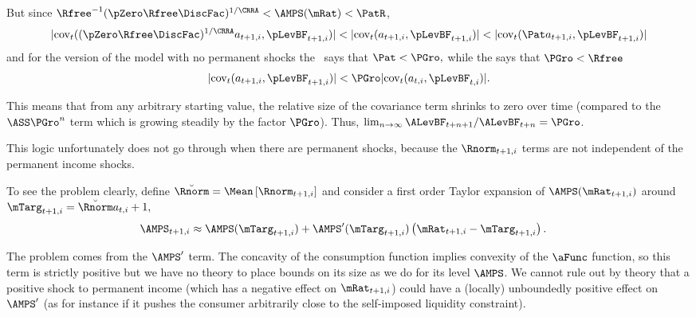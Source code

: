 \documentclass[../BufferStockTheory.tex]{subfiles}
\begin{document}
But since ${\Rfree}^{-1}(\pZero  \Rfree\DiscFac)^{1/\CRRA} < \AMPS(\mRat) < \PatR $,
\begin{equation}
  |\mbox{cov}_{t}((\pZero  \Rfree\DiscFac)^{1/\CRRA}a_{t+1,i},\pLevBF_{t+1,i})| <
  |\mbox{cov}_{t}(a_{t+1,i},\pLevBF_{t+1,i})| <
  |\mbox{cov}_{t}({\Pat}a_{t+1,i},\pLevBF_{t+1,i})| \nonumber
\end{equation}
and for the version of the model with no permanent shocks the \GIC~says that
${\Pat} < \PGro, $ while the {\FHWC} says that $\PGro < \Rfree$
\begin{equation}\begin{gathered}\begin{aligned}
  |\mbox{cov}_{t}(a_{t+1,i},\pLevBF_{t+1,i})| < \PGro
  |\mbox{cov}_{t}(a_{t,i},\pLevBF_{t,i})|. \nonumber
\end{aligned}\end{gathered}\end{equation}


This means that from any arbitrary starting value, the relative
size of the covariance term shrinks to zero over time (compared
to the $\ASS \PGro^{n}$ term which is growing steadily
by the factor $\PGro$).  Thus, $\lim_{n \rightarrow \infty} \ALevBF_{t+n+1}/\ALevBF_{t+n} = \PGro$.

This logic unfortunately does not go through when there are permanent
shocks, because the $\Rnorm _{t+1,i}$ terms are not independent
of the permanent income shocks.

To see the problem clearly, define $\breve{\Rnorm }=\Mean\left[\Rnorm _{t+1,i}\right]$ and consider a first order Taylor expansion of $\AMPS(\mRat_{t+1,i})$ around $\mTarg_{t+1,i}=\breve{\Rnorm } a_{t,i}+1,$
\begin{align*}
  \AMPS_{t+1,i} & \approx 
  \AMPS(\mTarg_{t+1,i})+\AMPS^{\prime}(\mTarg_{t+1,i})\left(\mRat_{t+1,i}-\mTarg_{t+1,i}\right)
 \nonumber.
\end{align*}
%


The problem comes from the $\AMPS^{\prime}$ term.  The
concavity of the consumption function implies convexity of the
$\aFunc$ function, so this term is strictly positive but we have no
theory to place bounds on its size as we do for its level $\AMPS$.
We cannot rule out by theory that a positive shock to permanent income (which has a
negative effect on $\mRat_{t+1,i}$) could have a (locally) unboundedly positive
effect on $\AMPS^{\prime}$ (as for instance if it pushes the
consumer arbitrarily close to the self-imposed liquidity constraint).
\end{document}
